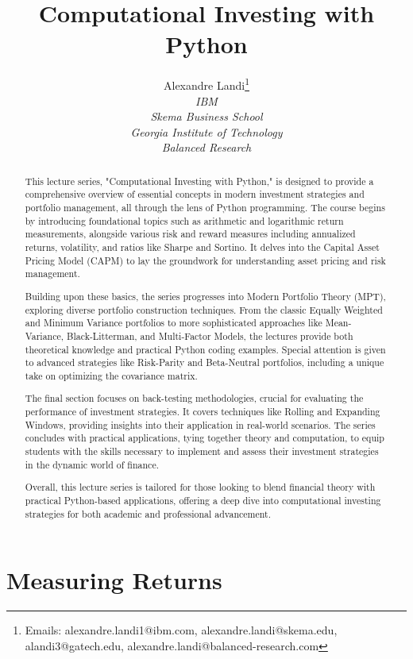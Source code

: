 \documentclass{article}
\title{Computational Investing with Python}
\author{Alexandre Landi\thanks{Emails: alexandre.landi1@ibm.com,
alexandre.landi@skema.edu,
alandi3@gatech.edu,
alexandre.landi@balanced-research.com} \\
    \textit{IBM} \\
    \textit{Skema Business School} \\
    \textit{Georgia Institute of Technology} \\
    \textit{Balanced Research} }
\begin{document}
\maketitle

\begin{abstract}
This lecture series, "Computational Investing with Python," is designed to provide a comprehensive overview of essential concepts in modern investment strategies and portfolio management, all through the lens of Python programming. The course begins by introducing foundational topics such as arithmetic and logarithmic return measurements, alongside various risk and reward measures including annualized returns, volatility, and ratios like Sharpe and Sortino. It delves into the Capital Asset Pricing Model (CAPM) to lay the groundwork for understanding asset pricing and risk management.

Building upon these basics, the series progresses into Modern Portfolio Theory (MPT), exploring diverse portfolio construction techniques. From the classic Equally Weighted and Minimum Variance portfolios to more sophisticated approaches like Mean-Variance, Black-Litterman, and Multi-Factor Models, the lectures provide both theoretical knowledge and practical Python coding examples. Special attention is given to advanced strategies like Risk-Parity and Beta-Neutral portfolios, including a unique take on optimizing the covariance matrix.

The final section focuses on back-testing methodologies, crucial for evaluating the performance of investment strategies. It covers techniques like Rolling and Expanding Windows, providing insights into their application in real-world scenarios. The series concludes with practical applications, tying together theory and computation, to equip students with the skills necessary to implement and assess their investment strategies in the dynamic world of finance.

Overall, this lecture series is tailored for those looking to blend financial theory with practical Python-based applications, offering a deep dive into computational investing strategies for both academic and professional advancement.
\end{abstract}

\tableofcontents
\clearpage

\section{Measuring Returns}
\end{document}
